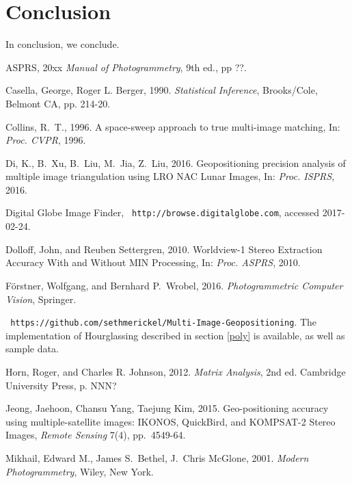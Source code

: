 \documentclass[10pt]{amsart}
\begin{document}
\section{Conclusion}
In conclusion, we conclude.





\begin{thebibliography}{99} %

ASPRS, 20xx {\em Manual of Photogrammetry}, 9th ed., pp ??.

 Casella, George, Roger L. Berger, 1990. {\em Statistical
  Inference}, Brooks/Cole, Belmont CA, pp. 214-20.

Collins, R.~T., 1996. A space-sweep approach to true
  multi-image matching, In: {\em Proc. CVPR}, 1996.

Di, K., B.~Xu, B.~Liu, M.~Jia, Z.~Liu, 2016. Geopositioning
  precision analysis of multiple image triangulation using LRO NAC Lunar
  Images, In: {\em Proc. ISPRS}, 2016.

Digital Globe Image Finder, {\tt
  http://browse.digitalglobe.com}, accessed 2017-02-24.

Dolloff, John, and Reuben Settergren, 2010. Worldview-1 Stereo
  Extraction Accuracy With and Without MIN Processing, In: {\em Proc. ASPRS}, 2010.

F\"orstner, Wolfgang, and Bernhard P.~Wrobel, 2016. {\em
  Photogrammetric Computer Vision}, Springer.

 {\tt
  https://github.com/sethmerickel/Multi-Image-Geopositioning}. The
  implementation of Hourglassing described in section \ref{poly} is available,
  as well as sample data.

Horn, Roger, and Charles R. Johnson, 2012. {\em Matrix
  Analysis}, 2nd ed. Cambridge University Press, p. NNN?

Jeong, Jaehoon, Chansu Yang, Taejung Kim, 2015. Geo-positioning
  accuracy using multiple-satellite images: IKONOS, QuickBird, and KOMPSAT-2
  Stereo Images, {\em Remote Sensing} 7(4), pp.~4549-64.

Mikhail, Edward M., James S.~Bethel, J.~Chris McGlone,
  2001. {\em Modern Photogrammetry}, Wiley, New York.


\end{thebibliography}
\end{document}
